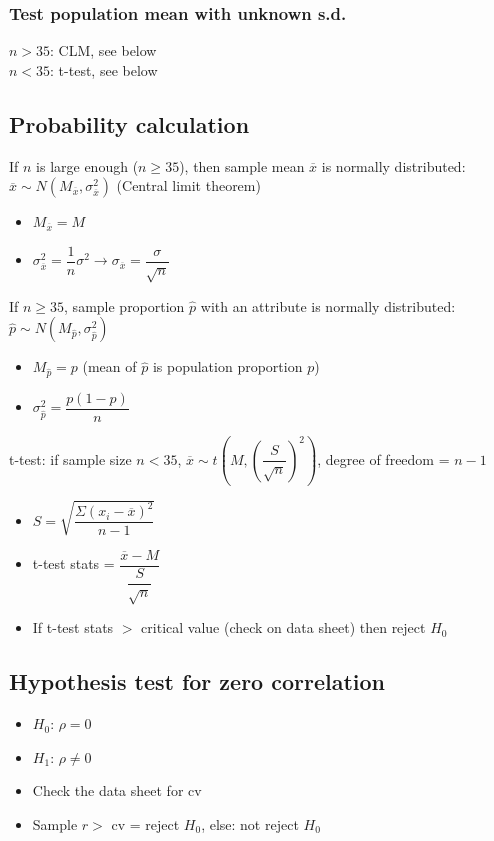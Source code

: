 \documentclass[A4paper]{article}
\begin{document}
	\subsubsection{Test population mean with unknown s.d.}
	$n>35$: CLM, see below\\
	$n<35$: t-test, see below
	
	\subsection{Probability calculation}
	If $n$ is large enough ($n\geq35$), then sample mean $\overline{x}$ is normally distributed: $\overline{x} \sim N(M_{\overline{x}}, \sigma_{\overline{x}}^2)$ (Central limit theorem)
	\begin{itemize}
		\item $M_{\overline{x}}=M$
		\item $\sigma_{\overline{x}}^2=\dfrac{1}{n}\sigma^2 \rightarrow \sigma_{\overline{x}} = \dfrac{\sigma}{\sqrt{n}}$
	\end{itemize}
	If $n\geq35$, sample proportion $\hat{p}$ with an attribute is normally distributed: $\hat{p}\sim N(M_{\hat{p}}, \sigma_{\hat{p}}^2)$
	\begin{itemize}
		\item $M_{\hat{p}}=p$ (mean of $\hat{p}$ is population proportion $p$)
		\item $\sigma_{\hat{p}}^2=\dfrac{p(1-p)}{n}$
	\end{itemize}
	t-test: if sample size $n<35$, $\overline{x} \sim t(M, (\dfrac{S}{\sqrt{n}})^2)$, degree of freedom = $n-1$
	\begin{itemize}
		\item $S=\sqrt{\dfrac{\Sigma (x_i-\overline{x})^2}{n-1}}$
		\item t-test stats = $\dfrac{\overline{x}-M}{\dfrac{S}{\sqrt{n}}}$
		\item If t-test stats $>$ critical value (check on data sheet) then reject $H_0$
	\end{itemize}
	
	\subsection{Hypothesis test for zero correlation}
	\begin{itemize}
		\item $H_0$: $\rho = 0$
		\item $H_1$: $\rho \neq 0$
		\item Check the data sheet for cv
		\item Sample $r >$ cv = reject $H_0$, else: not reject $H_0$
	\end{itemize}
	
\end{document}
